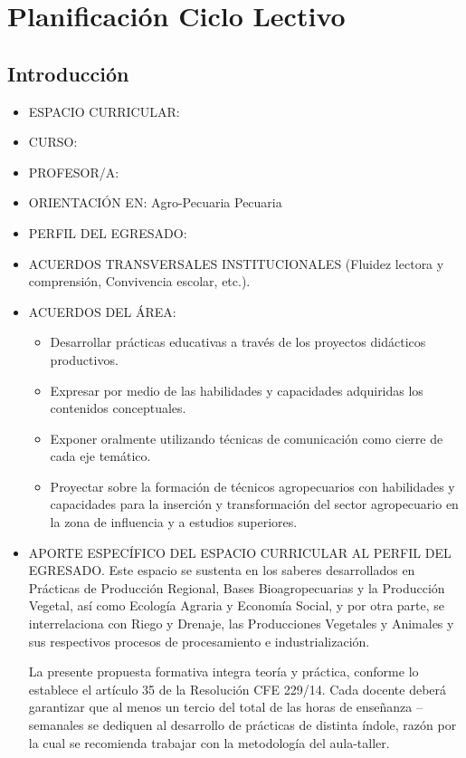 \chapter*{Planificación Ciclo Lectivo \ano}
\section*{Introducción}
\begin{itemize}
    
\item ESPACIO CURRICULAR: \materiaLong
\item CURSO:\curso
\item PROFESOR/A:\nombre
\item ORIENTACIÓN EN: Agro-Pecuaria Pecuaria
\item PERFIL DEL EGRESADO:
\item ACUERDOS TRANSVERSALES INSTITUCIONALES (Fluidez lectora y comprensión, Convivencia escolar, etc.).
\item ACUERDOS DEL ÁREA:
    \begin{itemize}
    \item Desarrollar prácticas educativas a través de los proyectos didácticos productivos.
    \item Expresar por medio de las habilidades y capacidades adquiridas los contenidos conceptuales.
    \item Exponer oralmente  utilizando técnicas de comunicación como cierre de cada eje temático.
    \item Proyectar sobre la formación de técnicos agropecuarios con habilidades y capacidades para la inserción y  transformación del sector agropecuario en la zona de influencia y a estudios superiores.
    \end{itemize}
    \item APORTE ESPECÍFICO DEL ESPACIO CURRICULAR AL PERFIL DEL EGRESADO.
    Este espacio se sustenta en los saberes desarrollados en Prácticas de
Producción Regional, Bases Bioagropecuarias y la Producción Vegetal, así como
Ecología Agraria y Economía Social, y por otra parte, se interrelaciona con Riego y
Drenaje, las Producciones Vegetales y Animales y sus respectivos procesos de
procesamiento e industrialización.

La presente propuesta formativa integra teoría y práctica, conforme lo
establece el artículo 35 de la Resolución CFE 229/14. Cada docente deberá garantizar
que al menos un tercio del total de las horas de enseñanza –semanales se dediquen al
desarrollo de prácticas de distinta índole, razón por la cual se recomienda trabajar con
la metodología del aula-taller. 
\end{itemize}
\newpage
